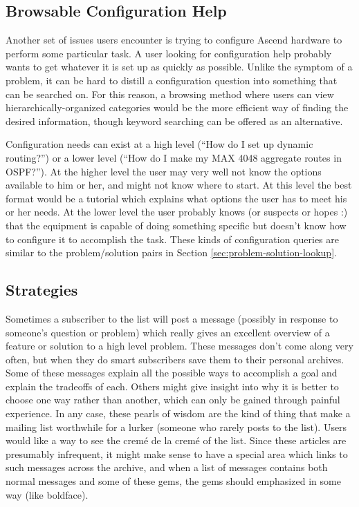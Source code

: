 \subsection{Browsable Configuration Help}
Another set of issues users encounter is trying to configure Ascend hardware to
perform some particular task. A user looking for configuration help probably
wants to get whatever it is set up as quickly as possible. Unlike the symptom
of a problem, it can be hard to distill a configuration question into something
that can be searched on. For this reason, a browsing method where users can
view hierarchically-organized categories would be the more efficient way of
finding the desired information, though keyword searching can be offered as an
alternative.
      
Configuration needs can exist at a high level (``How do I set up dynamic
routing?'') or a lower level (``How do I make my MAX 4048 aggregate routes in
OSPF?''). At the higher level the user may very well not know the options
available to him or her, and might not know where to start. At this level the
best format would be a tutorial which explains what options the user has to
meet his or her needs. At the lower level the user probably knows (or suspects
or hopes :) that the equipment is capable of doing something specific but
doesn't know how to configure it to accomplish the task. These kinds of
configuration queries are similar to the problem/solution pairs in Section
\ref{sec:problem-solution-lookup}.

\subsection{Strategies}
Sometimes a subscriber to the list will post a message (possibly in response to
someone's question or problem) which really gives an excellent overview of a
feature or solution to a high level problem. These messages don't come along
very often, but when they do smart subscribers save them to their personal
archives. Some of these messages explain all the possible ways to accomplish a
goal and explain the tradeoffs of each. Others might give insight into why it
is better to choose one way rather than another, which can only be gained
through painful experience. In any case, these pearls of wisdom are the kind of
thing that make a mailing list worthwhile for a lurker (someone who rarely
posts to the list).  Users would like a way to see the crem\'e de la crem\'e of
the list. Since these articles are presumably infrequent, it might make sense
to have a special area which links to such messages across the archive, and
when a list of messages contains both normal messages and some of these gems,
the gems should emphasized in some way (like boldface).

